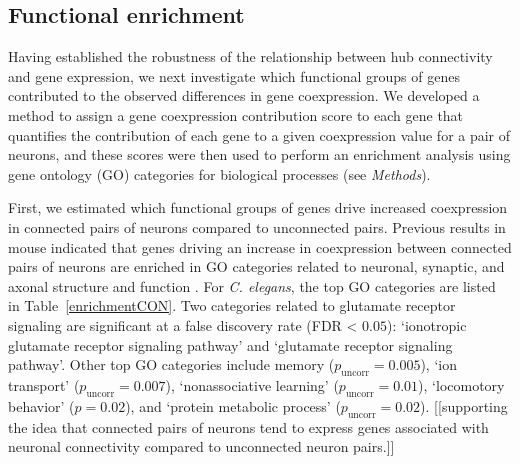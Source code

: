 \documentclass[10pt,letterpaper]{article}
\begin{document}
\subsection*{Functional enrichment}


Having established the robustness of the relationship between hub connectivity and gene expression, we next investigate which functional groups of genes contributed to the observed differences in gene coexpression.
We developed a method to assign a gene coexpression contribution score to each gene that quantifies the contribution of each gene to a given coexpression value for a pair of neurons, and these scores were then used to perform an enrichment analysis using gene ontology (GO) categories for biological processes \cite{Ashburner2000, Gillis2010} (see \emph{Methods}).


First, we estimated which functional groups of genes drive increased coexpression in connected pairs of neurons compared to unconnected pairs.
Previous results in mouse indicated that genes driving an increase in coexpression between connected pairs of neurons are enriched in GO categories related to neuronal, synaptic, and axonal structure and function
\cite{Fulcher:2016ck, Ji:2014jw, Fakhry:2015kl, French:2011cz}.
For \emph{C. elegans}, the top GO categories are listed in Table~\ref{enrichmentCON}.
Two categories related to glutamate receptor signaling are significant at a false discovery rate (FDR < $0.05$): `ionotropic glutamate receptor signaling pathway' and `glutamate receptor signaling pathway'.
Other top GO categories include memory ($p_\mathrm{uncorr} = 0.005$), `ion transport' ($p_\mathrm{uncorr} = 0.007$), `nonassociative learning' ($p_\mathrm{uncorr} = 0.01$), `locomotory behavior' ($p = 0.02$), and `protein metabolic process' ($p_\mathrm{uncorr} = 0.02$).
[[supporting the idea that connected pairs of neurons tend to express genes associated with neuronal connectivity compared to unconnected neuron pairs.]]
\end{document}

